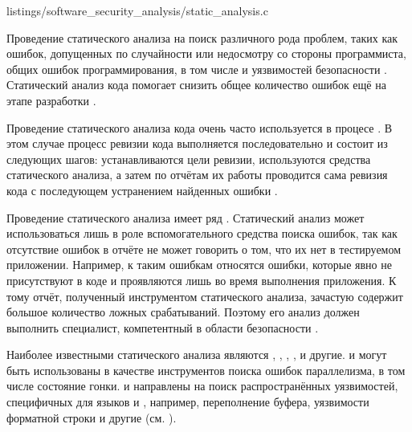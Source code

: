 	{listings/software_security_analysis/static_analysis.c}

%
Проведение статического анализа  на поиск различного рода проблем, таких как ошибок, допущенных по случайности или недосмотру со стороны программиста, общих ошибок программирования, в том числе и уязвимостей безопасности . 
%
Статический анализ кода помогает снизить общее количество ошибок ещё на этапе разработки 
.

%
Проведение статического анализа кода очень часто используется в процесе . 
%
В этом случае процесс ревизии кода выполняется последовательно и состоит из следующих шагов: устанавливаются цели ревизии, используются средства статического анализа, а затем по отчётам их работы проводится сама ревизия кода с последующем устранением найденных ошибки . 

%
Проведение статического анализа имеет ряд   . 
%
Статический анализ может использоваться лишь в роле вспомогательного средства поиска ошибок, так как отсутствие ошибок в отчёте не может говорить о том, что их нет в тестируемом приложении. 
%
Например, к таким ошибкам относятся ошибки, которые явно не присутствуют в коде и проявляются лишь во время выполнения приложения. 
%
К тому отчёт, полученный инструментом статического анализа, зачастую содержит большое количество ложных срабатываний. 
%
Поэтому его анализ должен выполнить специалист, компетентный в области безопасности .

%
Наиболее известными  статического анализа являются  ,  ,  ,  ,   и другие. 
%
 и  могут быть использованы в качестве инструментов поиска ошибок параллелизма, в том числе состояние гонки. 
%
 и  направлены на поиск распространённых уязвимостей, специфичных для языков   и  , например, переполнение буфера, уязвимости форматной строки и другие (см. ).

